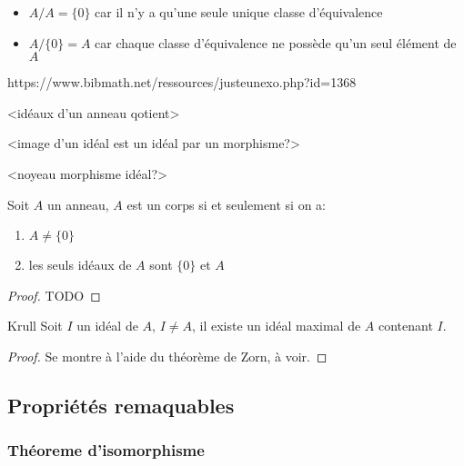 \begin{example}{}{}
    \begin{itemize}
        \item $A / A = \{0\}$ car il n'y a qu'une seule unique classe d'équivalence
        \item $A / \{0\} = A$ car chaque classe d'équivalence ne possède qu'un seul élément de $A$
    \end{itemize}
\end{example}

https://www.bibmath.net/ressources/justeunexo.php?id=1368

<idéaux d'un anneau qotient>

<image d'un idéal est un idéal par un morphisme?>

<noyeau morphisme idéal?>

\begin{lemma}{}{}
    Soit $A$ un anneau, $A$ est un corps si et seulement si on a:
    \begin{enumerate}[(1)]
        \item $A \neq \{0\}$
        \item les seuls idéaux de $A$ sont $\{0\}$ et $A$
    \end{enumerate}
\end{lemma}

\begin{proof}
    TODO
\end{proof}

\begin{theorem}{Krull}{}
    Soit $I$ un idéal de $A$, $I \neq A$, il existe un idéal maximal de $A$ contenant $I$.
\end{theorem}

\begin{proof}
    Se montre à l'aide du théorème de Zorn, à voir.
\end{proof}

\subsection{Propriétés remaquables}

\subsubsection{Théoreme d'isomorphisme}

